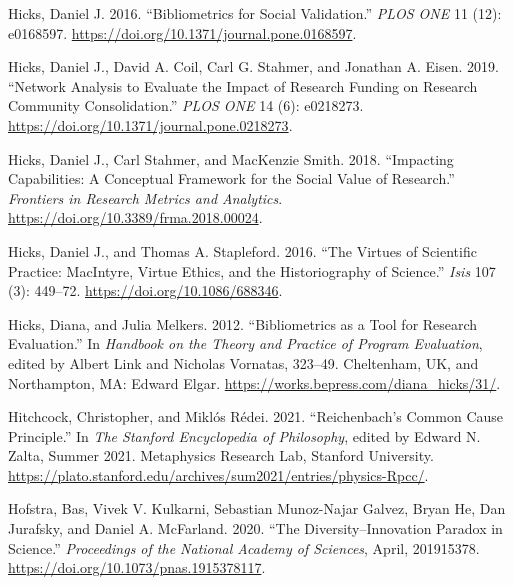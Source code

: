 \documentclass[
  11pt,
]{article}
\newlength{\cslhangindent}
\newenvironment{CSLReferences}[2] %
 {%
  \setlength{\parindent}{0pt}
  \ifodd #1 \everypar{\setlength{\hangindent}{\cslhangindent}}\ignorespaces\fi
  \ifnum #2 > 0
  \setlength{\parskip}{#2\baselineskip}
  \fi
 }%
 {}
\begin{document}
\begin{CSLReferences}{1}{0}
\leavevmode{}%
Hicks, Daniel J. 2016. {``Bibliometrics for Social Validation.''} \emph{PLOS ONE} 11 (12): e0168597. \url{https://doi.org/10.1371/journal.pone.0168597}.

\leavevmode{}%
Hicks, Daniel J., David A. Coil, Carl G. Stahmer, and Jonathan A. Eisen. 2019. {``Network Analysis to Evaluate the Impact of Research Funding on Research Community Consolidation.''} \emph{PLOS ONE} 14 (6): e0218273. \url{https://doi.org/10.1371/journal.pone.0218273}.

\leavevmode{}%
Hicks, Daniel J., Carl Stahmer, and MacKenzie Smith. 2018. {``Impacting Capabilities: A Conceptual Framework for the Social Value of Research.''} \emph{Frontiers in Research Metrics and Analytics}. \url{https://doi.org/10.3389/frma.2018.00024}.

\leavevmode{}%
Hicks, Daniel J., and Thomas A. Stapleford. 2016. {``The Virtues of Scientific Practice: MacIntyre, Virtue Ethics, and the Historiography of Science.''} \emph{Isis} 107 (3): 449--72. \url{https://doi.org/10.1086/688346}.

\leavevmode{}%
Hicks, Diana, and Julia Melkers. 2012. {``Bibliometrics as a Tool for Research Evaluation.''} In \emph{Handbook on the Theory and Practice of Program Evaluation}, edited by Albert Link and Nicholas Vornatas, 323--49. Cheltenham, UK, and Northampton, MA: Edward Elgar. \url{https://works.bepress.com/diana_hicks/31/}.

\leavevmode{}%
Hitchcock, Christopher, and Miklós Rédei. 2021. {``Reichenbach's Common Cause Principle.''} In \emph{The Stanford Encyclopedia of Philosophy}, edited by Edward N. Zalta, Summer 2021. Metaphysics Research Lab, Stanford University. \url{https://plato.stanford.edu/archives/sum2021/entries/physics-Rpcc/}.

\leavevmode{}%
Hofstra, Bas, Vivek V. Kulkarni, Sebastian Munoz-Najar Galvez, Bryan He, Dan Jurafsky, and Daniel A. McFarland. 2020. {``The Diversity--Innovation Paradox in Science.''} \emph{Proceedings of the National Academy of Sciences}, April, 201915378. \url{https://doi.org/10.1073/pnas.1915378117}.


\end{CSLReferences}
\end{document}
